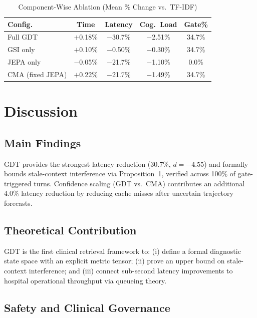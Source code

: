 \documentclass[journal,10pt,twoside]{IEEEtran}
\begin{document}
\begin{table}[!t]
  \centering
  \caption{Component-Wise Ablation (Mean \% Change vs.\ TF-IDF)}
  \label{tab:ablation}
  \renewcommand{\arraystretch}{1.15}
  \begin{tabular}{lcccc}
    \toprule
    \textbf{Config.}   & \textbf{Time} & \textbf{Latency} & \textbf{Cog.\ Load} & \textbf{Gate\%} \\
    \midrule
    Full GDT             & $+$0.18\%  & $-$30.7\%  & $-$2.51\% & 34.7\% \\
    GSI only             & $+$0.10\%  & $-$0.50\%  & $-$0.30\% & 34.7\% \\
    JEPA only            & $-$0.05\%  & $-$21.7\%  & $-$1.10\% & 0.0\%  \\
    CMA (fixed JEPA)     & $+$0.22\%  & $-$21.7\%  & $-$1.49\% & 34.7\% \\
    \bottomrule
  \end{tabular}
\end{table}

\section{Discussion}
\label{sec:discussion}

\subsection{Main Findings}

GDT provides the strongest latency reduction (30.7\%, $d{=}{-4.55}$) and formally bounds stale-context interference via Proposition~1, verified across 100\% of gate-triggered turns. Confidence scaling (GDT vs.\ CMA) contributes an additional 4.0\% latency reduction by reducing cache misses after uncertain trajectory forecasts.

\subsection{Theoretical Contribution}

GDT is the first clinical retrieval framework to: (i) define a formal diagnostic state space with an explicit metric tensor; (ii) prove an upper bound on stale-context interference; and (iii) connect sub-second latency improvements to hospital operational throughput via queueing theory.

\subsection{Safety and Clinical Governance}
\end{document}
